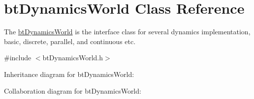 \hypertarget{classbt_dynamics_world}{\section{bt\+Dynamics\+World Class Reference}
\label{classbt_dynamics_world}
}


The \hyperlink{classbt_dynamics_world}{bt\+Dynamics\+World} is the interface class for several dynamics implementation, basic, discrete, parallel, and continuous etc.  




{\ttfamily \#include $<$bt\+Dynamics\+World.\+h$>$}



Inheritance diagram for bt\+Dynamics\+World\+:


Collaboration diagram for bt\+Dynamics\+World\+:
